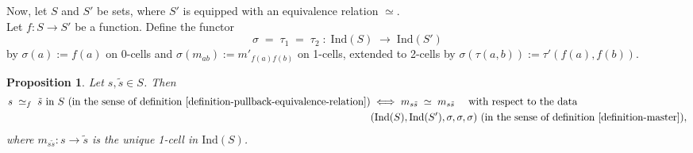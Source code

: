 \documentclass[a4paper,10pt]{article}
\theoremstyle{plain}
\newtheorem{proposition}[theorem]{Proposition}
\theoremstyle{definition}
\theoremstyle{remark}
\begin{document}
Now, let $S$ and $S'$ be sets, where $S'$ is equipped with an equivalence relation $\simeq$. \\
Let $f : S \to S'$ be a function. Define the functor
\[
  \sigma \;=\; \tau_1 \;=\; \tau_2 \;:\; \mathrm{Ind}(S) \;\longrightarrow\; \mathrm{Ind}(S')
\]
by $\sigma(a) := f(a)$ on 0-cells and
$\sigma\!\left(m_{ab}\right) := m'_{f(a)f(b)}$ on 1-cells,
extended to 2-cells by $\sigma(\tau(a,b)) := \tau'(f(a),f(b))$.

\begin{proposition}
  \label{proposition-pullback-equivalence-relation-is-the-same-as-the-main-equivalence-relation}
  Let $s, \tilde{s} \in S$. Then
  \begin{align*}
    s \;\simeq_f\; \tilde{s} \text{ in } S \text{ (in the sense of definition \ref{definition-pullback-equivalence-relation})} &\iff  m_{s\tilde{s}} \;\simeq\; m_{s\tilde{s}}
    \quad \text{ with respect to the data } \\
    &(\mathrm{Ind}(S), \mathrm{Ind}(S'), \mathsf{\sigma}, \mathsf{\sigma}, \mathsf{\sigma}) \text{ (in the sense of definition \ref{definition-master})},
  \end{align*}
where $m_{s\tilde{s}} : s \to \tilde{s}$ is the unique
  1-cell in $\mathrm{Ind}(S)$. 
\end{proposition}
\end{document}
